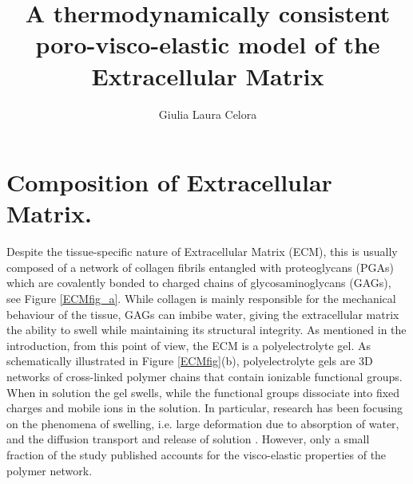 \documentclass[runningheads]{llncs}
\begin{document}
%
\title{A thermodynamically consistent poro-visco-elastic model of the Extracellular Matrix}
%
%
\author{Giulia Laura Celora}
%
%
%
\maketitle              %
%
\begin{abstract}

\end{abstract}
%
%
%


\section{Composition of Extracellular Matrix.}
\label{ECMcomp}
Despite the tissue-specific nature of Extracellular Matrix (ECM), this is usually composed of a network of collagen fibrils entangled with proteoglycans (PGAs) which are covalently bonded to charged chains of glycosaminoglycans (GAGs), see Figure \ref{ECMfig_a}.  While collagen is mainly responsible for the mechanical behaviour of the tissue, GAGs can imbibe water, giving the extracellular matrix the ability to swell while maintaining its structural integrity. As mentioned in the introduction, from this point of view, the ECM is a polyelectrolyte gel. As schematically illustrated in Figure \ref{ECMfig}(b), polyelectrolyte gels are 3D networks of cross-linked polymer chains that contain ionizable functional groups. When in solution the gel swells, while the functional groups dissociate into fixed charges and mobile ions in the solution.  In particular, research has been focusing on the phenomena of swelling, i.e. large deformation due to absorption of water, and the diffusion transport and release of solution  \cite{DROZDOV+,DROZDOVph,Reviewpolyel,swell2}. However, only a small fraction of the study published accounts for the visco-elastic properties of the polymer network.
\end{document}
